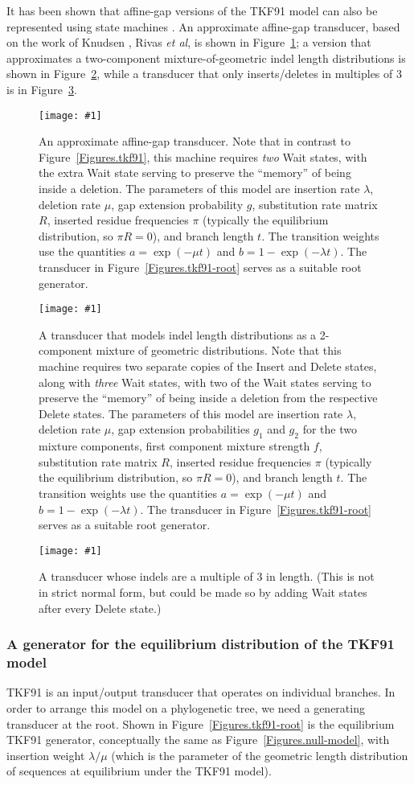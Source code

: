 \documentclass{article}
\newcommand{\figref}[1]{Figure~\ref{Figures.#1}}
\newcommand{\figlabel}[1]{\label{Figures.#1}}
\newcommand{\easyfig}[4]{
\begin{figure}
\texttt{[image: \#1]}
\caption{ \figlabel{#3} #4}
\end{figure}}
\newcommand{\pdffig}[2]{\easyfig{#1-fig.pdf}{}{#1}{#2}}
\newcommand{\widepdffig}[2]{\easyfig{#1-fig.pdf}{width=\textwidth}{#1}{#2}}
\newcommand{\tallpdffig}[2]{\easyfig{#1-fig.pdf}{height=.8\textheight}{#1}{#2}}
\begin{document}
It has been shown that affine-gap versions of the TKF91 model can also be represented using state machines \cite{MiklosLunterHolmes2004}.
An approximate affine-gap transducer, based on the work of Knudsen \cite{KnudsenMiyamoto2003}, Rivas \cite{Rivas05} {\em et al}, is shown in \figref{protpal};
a version that approximates a two-component mixture-of-geometric indel length distributions is shown in \figref{protpal-mix2},
while a transducer that only inserts/deletes in multiples of 3 is in \figref{triplet}.

\pdffig{protpal}{An approximate affine-gap transducer.
Note that in contrast to \figref{tkf91}, this machine requires {\em two} Wait states,
with the extra Wait state serving to preserve the ``memory'' of being inside a deletion.
The parameters of this model are insertion rate $\lambda$, deletion rate $\mu$, gap extension probability $g$,
substitution rate matrix $R$, inserted residue frequencies $\pi$ (typically the equilibrium distribution, so $\pi R = 0$), and branch length $t$.
The transition weights use the quantities
$a = \exp(-\mu t)$ and $b = 1 - \exp(-\lambda t)$.
The transducer in \figref{tkf91-root} serves as a suitable root generator.
}

\widepdffig{protpal-mix2}{A transducer that models indel length distributions as a 2-component mixture of geometric distributions.
Note that this machine requires
two separate copies of the Insert and Delete states, along with {\em three} Wait states,
with two of the Wait states serving to preserve the ``memory'' of being inside a deletion from the respective Delete states.
The parameters of this model are insertion rate $\lambda$, deletion rate $\mu$, gap extension probabilities $g_1$ and $g_2$ for the two mixture components,
first component mixture strength $f$, substitution rate matrix $R$, inserted residue frequencies $\pi$ (typically the equilibrium distribution, so $\pi R = 0$), and branch length $t$.
The transition weights use the quantities
$a = \exp(-\mu t)$ and $b = 1 - \exp(-\lambda t)$.
The transducer in \figref{tkf91-root} serves as a suitable root generator.
}

\tallpdffig{triplet}{A transducer whose indels are a multiple of 3 in length.
(This is not in strict normal form, but could be made so by adding Wait states after every Delete state.)}

\subsubsection{A generator for the equilibrium distribution of the TKF91 model} TKF91 is an input/output transducer that
operates on individual branches.  In order to arrange this model on a phylogenetic tree,
we need a generating transducer at the root.  
Shown in \figref{tkf91-root} is the equilibrium TKF91 generator, conceptually the same as
\figref{null-model}, with insertion weight $\lambda/\mu$
(which is the parameter of the geometric length distribution of sequences at equilibrium under the TKF91 model).
\end{document}
